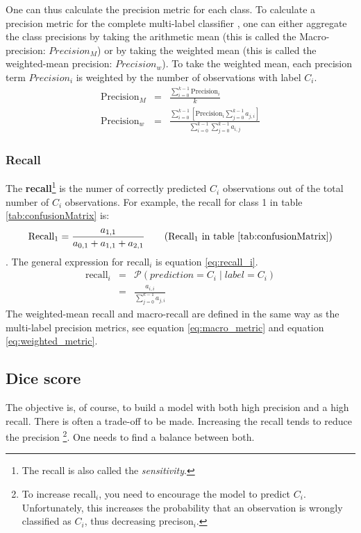 \par{
    One can thus calculate the precision metric for each class. 
    To calculate a precision metric for the complete multi-label classifier
    , one can either aggregate the class precisions by taking the arithmetic mean (this is called the Macro-precision: $Precision_M$) or by taking the weighted mean (this is called the weighted-mean precision: $Precision_w$).
    To take the weighted mean, each precision term $Precision_i$ is weighted by the number of observations with label $C_i$. 
    \begin{eqnarray}
        \text{Precision}_M &=& \frac{\sum_{i=0}^{k-1} \text{Precision}_i}{k}  \label{eq:macro_metric}\\
        \text{Precision}_w &=& \frac{\sum_{i=0}^{k-1} \left[ \text{Precision}_i \sum_{j=0}^{k-1} a_{j,i} \right] }{\sum_{i=0}^{k-1} \sum_{j=0}^{k-1} a_{i,j} }  \label{eq:weighted_metric}
    \end{eqnarray}
}
\subsubsection{Recall}
\par{
    The \textbf{recall}\footnote{The recall is also called the \textit{sensitivity}.} is the numer of correctly predicted $C_i$ observations out of the total number of $C_i$ observations.
    For example, the recall for class 1 in table \ref{tab:confusionMatrix} is:
    \begin{equation}
        \text{Recall}_1 = \frac{a_{1,1}}{a_{0,1} + a_{1,1} + a_{2, 1}} \tag{Recall$_1$ in table \ref{tab:confusionMatrix}}
    \end{equation}.
    The general expression for recall$_i$ is equation \ref{eq:recall_i}.
    \begin{eqnarray}
        \text{recall}_i &=& \mathcal{P} \left( prediction = C_i \mid label = C_i \right) \\
        &=& \frac{a_{i, i}}{\sum_{j=0}^{k-1} a_{j, i}} \label{eq:recall_i}
    \end{eqnarray}
    The weighted-mean recall and macro-recall are defined in the same way as the multi-label precision metrics, see equation \ref{eq:macro_metric} and equation \ref{eq:weighted_metric}.
}
\subsection{Dice score\label{sec:dice}}
\par{
    The objective is, of course, to build a model with both high precision and a high recall.
    There is often a trade-off to be made. 
    Increasing the recall tends to reduce the precision
    \footnote{To increase recall$_i$, you need to encourage the model to predict $C_i$. Unfortunately, this increases the probability that an observation is wrongly classified as $C_i$, thus decreasing precison$_i$.}.
    One needs to find a balance between both.
}

